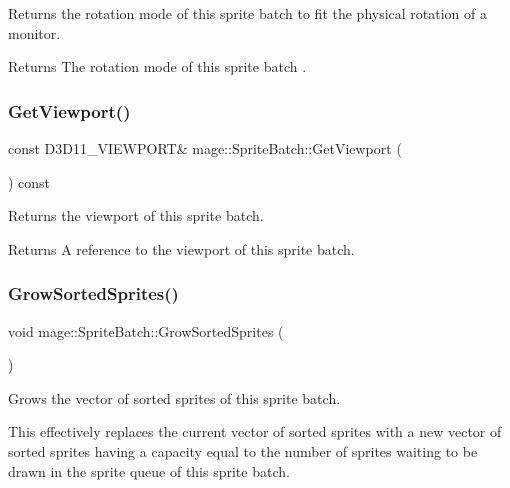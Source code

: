Returns the rotation mode of this sprite batch to fit the physical rotation of a monitor.

\begin{DoxyReturn}{Returns}
The rotation mode of this sprite batch . 
\end{DoxyReturn}
\hypertarget{classmage_1_1_sprite_batch_ab4f95db776d7c20896f9420bc60d90c8}{}\label{classmage_1_1_sprite_batch_ab4f95db776d7c20896f9420bc60d90c8} 
\subsubsection{\texorpdfstring{Get\+Viewport()}{GetViewport()}}
{\footnotesize\ttfamily const D3\+D11\+\_\+\+V\+I\+E\+W\+P\+O\+RT\& mage\+::\+Sprite\+Batch\+::\+Get\+Viewport (\begin{DoxyParamCaption}{ }\end{DoxyParamCaption}) const\hspace{0.3cm}{\ttfamily [noexcept]}}

Returns the viewport of this sprite batch.

\begin{DoxyReturn}{Returns}
A reference to the viewport of this sprite batch. 
\end{DoxyReturn}
\hypertarget{classmage_1_1_sprite_batch_ae403aa1afdd7df1f67bfd98ced8e76a4}{}\label{classmage_1_1_sprite_batch_ae403aa1afdd7df1f67bfd98ced8e76a4} 
\subsubsection{\texorpdfstring{Grow\+Sorted\+Sprites()}{GrowSortedSprites()}}
{\footnotesize\ttfamily void mage\+::\+Sprite\+Batch\+::\+Grow\+Sorted\+Sprites (\begin{DoxyParamCaption}{ }\end{DoxyParamCaption})\hspace{0.3cm}{\ttfamily [private]}}

Grows the vector of sorted sprites of this sprite batch.

This effectively replaces the current vector of sorted sprites with a new vector of sorted sprites having a capacity equal to the number of sprites waiting to be drawn in the sprite queue of this sprite batch.

